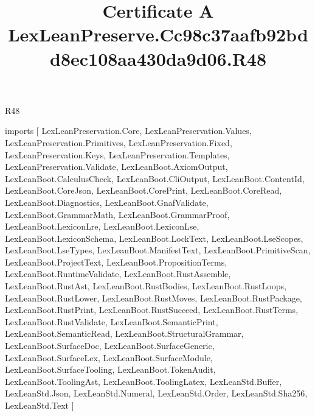\begin{lexlean}{R48}
\title{Certificate A LexLeanPreserve.Cc98c37aafb92bdd8ec108aa430da9d06.R48}
\begin{coremodule}
imports [
  LexLeanPreservation.Core,
  LexLeanPreservation.Values,
  LexLeanPreservation.Primitives,
  LexLeanPreservation.Fixed,
  LexLeanPreservation.Keys,
  LexLeanPreservation.Templates,
  LexLeanPreservation.Validate,
  LexLeanBoot.AxiomOutput,
  LexLeanBoot.CalculusCheck,
  LexLeanBoot.CliOutput,
  LexLeanBoot.ContentId,
  LexLeanBoot.CoreJson,
  LexLeanBoot.CorePrint,
  LexLeanBoot.CoreRead,
  LexLeanBoot.Diagnostics,
  LexLeanBoot.GnafValidate,
  LexLeanBoot.GrammarMath,
  LexLeanBoot.GrammarProof,
  LexLeanBoot.LexiconLre,
  LexLeanBoot.LexiconLse,
  LexLeanBoot.LexiconSchema,
  LexLeanBoot.LockText,
  LexLeanBoot.LseScopes,
  LexLeanBoot.LseTypes,
  LexLeanBoot.ManifestText,
  LexLeanBoot.PrimitiveScan,
  LexLeanBoot.ProjectText,
  LexLeanBoot.PropositionTerms,
  LexLeanBoot.RuntimeValidate,
  LexLeanBoot.RustAssemble,
  LexLeanBoot.RustAst,
  LexLeanBoot.RustBodies,
  LexLeanBoot.RustLoops,
  LexLeanBoot.RustLower,
  LexLeanBoot.RustMoves,
  LexLeanBoot.RustPackage,
  LexLeanBoot.RustPrint,
  LexLeanBoot.RustSucceed,
  LexLeanBoot.RustTerms,
  LexLeanBoot.RustValidate,
  LexLeanBoot.SemanticPrint,
  LexLeanBoot.SemanticRead,
  LexLeanBoot.StructuralGrammar,
  LexLeanBoot.SurfaceDoc,
  LexLeanBoot.SurfaceGeneric,
  LexLeanBoot.SurfaceLex,
  LexLeanBoot.SurfaceModule,
  LexLeanBoot.SurfaceTooling,
  LexLeanBoot.TokenAudit,
  LexLeanBoot.ToolingAst,
  LexLeanBoot.ToolingLatex,
  LexLeanStd.Buffer,
  LexLeanStd.Json,
  LexLeanStd.Numeral,
  LexLeanStd.Order,
  LexLeanStd.Sha256,
  LexLeanStd.Text
]


\end{coremodule}
\end{lexlean}

